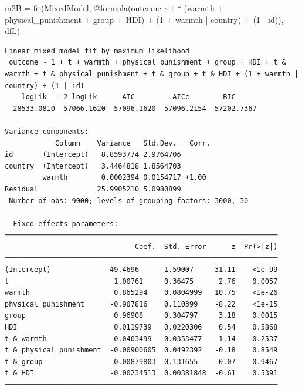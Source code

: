 \documentclass[
  letterpaper,
  DIV=11,
  numbers=noendperiod]{scrreprt}
\newenvironment{Shaded}{\begin{snugshade}}{\end{snugshade}}
\newcommand{\FloatTok}[1]{\textcolor[rgb]{0.68,0.00,0.00}{#1}}
\newcommand{\FunctionTok}[1]{\textcolor[rgb]{0.28,0.35,0.67}{#1}}
\newcommand{\NormalTok}[1]{\textcolor[rgb]{0.00,0.23,0.31}{#1}}
\newcommand{\OperatorTok}[1]{\textcolor[rgb]{0.37,0.37,0.37}{#1}}
\newcommand{\PreprocessorTok}[1]{\textcolor[rgb]{0.68,0.00,0.00}{#1}}
\begin{document}
\begin{Shaded}
\begin{Highlighting}[]

\NormalTok{m2B }\OperatorTok{=} \FunctionTok{fit}\NormalTok{(MixedModel, }\PreprocessorTok{@formula}\NormalTok{(outcome }\OperatorTok{\textasciitilde{}}\NormalTok{ t }\OperatorTok{*}\NormalTok{ (warmth }\OperatorTok{+} 
\NormalTok{                                 physical\_punishment }\OperatorTok{+} 
\NormalTok{                                 group }\OperatorTok{+}\NormalTok{ HDI) }\OperatorTok{+}
\NormalTok{                                 (}\FloatTok{1} \OperatorTok{+}\NormalTok{ warmth }\OperatorTok{|}\NormalTok{ country) }\OperatorTok{+}
\NormalTok{                                 (}\FloatTok{1} \OperatorTok{|}\NormalTok{ id)), dfL)}
\end{Highlighting}
\end{Shaded}

\begin{verbatim}
Linear mixed model fit by maximum likelihood
 outcome ~ 1 + t + warmth + physical_punishment + group + HDI + t & warmth + t & physical_punishment + t & group + t & HDI + (1 + warmth | country) + (1 | id)
    logLik   -2 logLik      AIC         AICc        BIC     
 -28533.0810  57066.1620  57096.1620  57096.2154  57202.7367

Variance components:
            Column    Variance   Std.Dev.   Corr.
id       (Intercept)   8.8593774 2.9764706
country  (Intercept)   3.4464818 1.8564703
         warmth        0.0002394 0.0154717 +1.00
Residual              25.9905210 5.0980899
 Number of obs: 9000; levels of grouping factors: 3000, 30

  Fixed-effects parameters:
─────────────────────────────────────────────────────────────────
                               Coef.  Std. Error      z  Pr(>|z|)
─────────────────────────────────────────────────────────────────
(Intercept)              49.4696      1.59007     31.11    <1e-99
t                         1.00761     0.36475      2.76    0.0057
warmth                    0.865294    0.0804999   10.75    <1e-26
physical_punishment      -0.907816    0.110399    -8.22    <1e-15
group                     0.96908     0.304797     3.18    0.0015
HDI                       0.0119739   0.0220306    0.54    0.5868
t & warmth                0.0403499   0.0353477    1.14    0.2537
t & physical_punishment  -0.00900605  0.0492392   -0.18    0.8549
t & group                 0.00879803  0.131655     0.07    0.9467
t & HDI                  -0.00234513  0.00381848  -0.61    0.5391
─────────────────────────────────────────────────────────────────
\end{verbatim}
\end{document}

